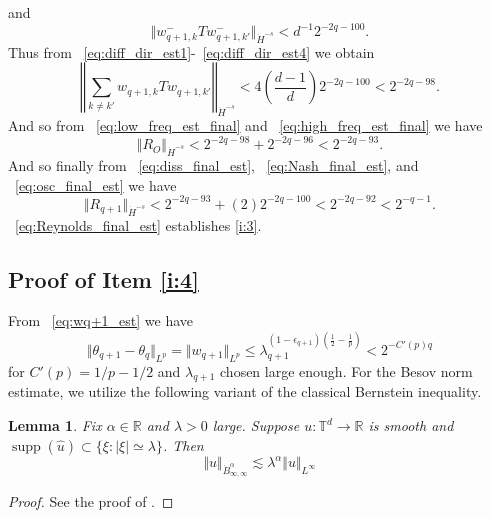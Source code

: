 \documentclass[12pt,reqno,letterpaper]{amsart}
\numberwithin{equation}{section}
\newcommand{\1}{{\bf 1}}
\newcommand{\2}{{\bf 2}}
\newcommand{\R}{\mathbb R}
\newcommand{\T}{\mathbb T}
\newtheorem{lemma}[theorem]{Lemma}
\theoremstyle{remark}
\theoremstyle{remark}
\begin{document}
and
\begin{equation}\label{eq:diff_dir_est4}
    \Vert w_{q+1,k}^-Tw_{q+1,k'}^-\Vert_{\dot{H}^{-s}} < d^{-1}2^{-2q-100}.
\end{equation}
Thus from ~\eqref{eq:diff_dir_est1}-~\eqref{eq:diff_dir_est4} we obtain
\begin{equation}\label{eq:high_freq_est_final}
    \left\Vert \sum_{k \not = k'} w_{q+1,k}Tw_{q+1,k'}\right\Vert_{\dot{H}^{-s}} < 4\left(\frac{d-1}{d}\right)2^{-2q-100} < 2^{-2q-98}.
\end{equation}
And so from ~\eqref{eq:low_freq_est_final} and ~\eqref{eq:high_freq_est_final} we have
\begin{equation}\label{eq:osc_final_est}
    \Vert R_O \Vert_{\dot{H}^{-s}} < 2^{-2q-98} + 2^{-2q-96} < 2^{-2q-93}.
\end{equation}
And so finally from ~\eqref{eq:diss_final_est}, ~\eqref{eq:Nash_final_est}, and ~\eqref{eq:osc_final_est} we have
\begin{equation}\label{eq:Reynolds_final_est}
    \Vert R_{q+1} \Vert_{\dot{H}^{-s}} < 2^{-2q-93} + (2)2^{-2q-100} < 2^{-2q-92} < 2^{-q-1}.
\end{equation}
~\eqref{eq:Reynolds_final_est} establishes \ref{i:3}.









\subsection{Proof of Item \ref{i:4}}
From ~\eqref{eq:wq+1_est} we have
\begin{equation}\label{eq:L^p_est}
    \Vert \theta_{q+1} - \theta_q \Vert_{L^p} = \Vert w_{q+1} \Vert_{L^p} \leq \lambda_{q+1}^{(1-\epsilon_{q+1})\left(\frac{1}{2} - \frac{1}{p}\right)} < 2^{-C'(p)q}
\end{equation}
for $C'(p) = 1/p - 1/2$ and $\lambda_{q+1}$ chosen large enough. For the Besov norm estimate, we utilize the following variant of the classical Bernstein inequality.
\begin{lemma}\label{lem:Bernstein}
    Fix $\alpha \in \R$ and $\lambda > 0$ large. Suppose $u:\T^d \to \R$ is smooth and
    $\operatorname{supp}(\hat{u}) \subset \{\xi : |\xi| \simeq \lambda\}$. Then
    \begin{equation*}
        \Vert u \Vert_{\dot{B}^\alpha_{\infty,\infty}} \lesssim \lambda^\alpha \Vert u \Vert_{L^{\infty}}
    \end{equation*}
\end{lemma}
\begin{proof}
    See the proof of \cite[Lemma 5.7]{GR}.
\end{proof}
\end{document}
